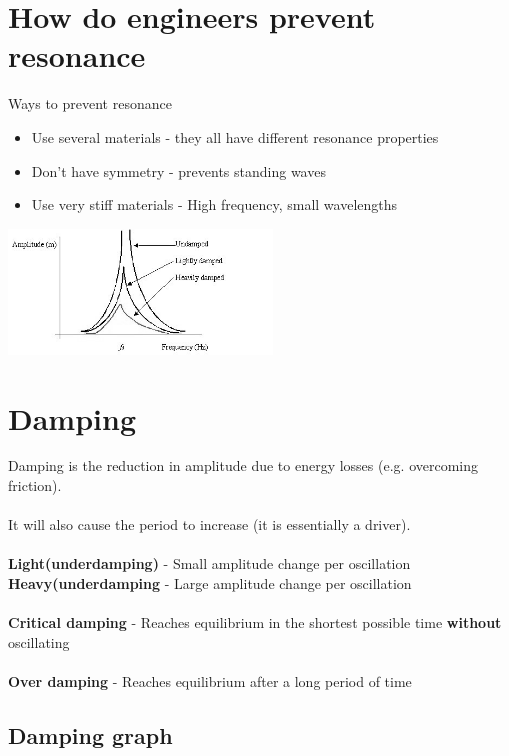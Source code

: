 \documentclass{article}[18pt]
\begin{document}
\section{How do engineers prevent resonance}
Ways to prevent resonance
\begin{itemize}
\item Use several materials - they all have different resonance properties
\item Don't have symmetry - prevents standing waves
\item Use very stiff materials - High frequency, small wavelengths
\end{itemize}


\includegraphics[width=7cm] {damp_6.jpg}
\section{Damping}
Damping is the reduction in amplitude due to energy losses (e.g. overcoming friction).\\
\\
It will also cause the period to increase (it is essentially a driver).\\
\\
\textbf{Light(underdamping)} - Small amplitude change per oscillation\\
\textbf{Heavy(underdamping} - Large amplitude change per oscillation\\
\\
\textbf{Critical damping} - Reaches equilibrium in the shortest possible time \textbf{without} oscillating\\
\\
\textbf{Over damping} - Reaches equilibrium after a long period of time
\subsection{Damping graph}
\end{document}
